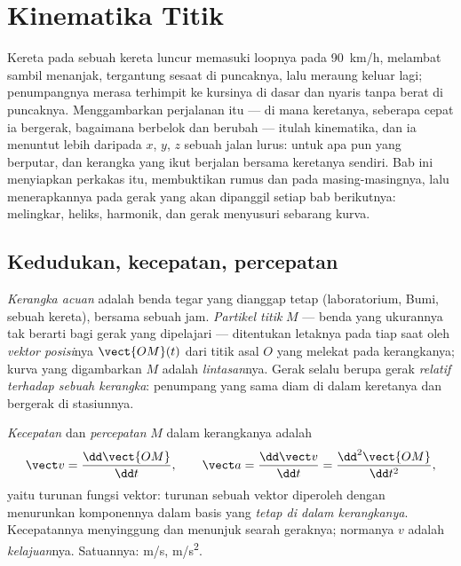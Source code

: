 \chapter{Kinematika Titik}\label{ch:b1:point-kinematics}

Kereta pada sebuah kereta luncur memasuki loopnya pada \qty{90}{km/h},
melambat sambil menanjak, tergantung sesaat di puncaknya, lalu meraung
keluar lagi; penumpangnya merasa terhimpit ke kursinya di dasar dan
nyaris tanpa berat di puncaknya. Menggambarkan perjalanan itu --- di
mana keretanya, seberapa cepat ia bergerak, bagaimana 
berbelok dan berubah --- itulah kinematika, dan ia menuntut lebih
daripada $x$, $y$, $z$ sebuah jalan lurus:  untuk apa pun
yang berputar, dan kerangka yang ikut berjalan bersama keretanya
sendiri. Bab ini menyiapkan perkakas itu, membuktikan rumus 
dan  pada masing-masingnya, lalu menerapkannya pada gerak yang
akan dipanggil setiap bab berikutnya: melingkar, heliks, harmonik, dan
gerak menyusuri sebarang kurva.

\section{Kedudukan, kecepatan, percepatan}

\begin{definition}\label{def:b1:point-kinematics:frame}
\emph{Kerangka acuan} adalah benda tegar yang dianggap tetap
(laboratorium, Bumi, sebuah kereta), bersama sebuah jam. \emph{Partikel
titik} $M$ --- benda yang ukurannya tak berarti bagi gerak yang
dipelajari --- ditentukan letaknya pada tiap saat oleh \emph{vektor
posisi}nya $\vect{OM}(t)$ dari titik asal $O$ yang melekat pada
kerangkanya; kurva yang digambarkan $M$ adalah \emph{lintasan}nya. Gerak
selalu berupa gerak \emph{relatif terhadap sebuah kerangka}: penumpang
yang sama diam di dalam keretanya dan bergerak di stasiunnya.
\end{definition}

\begin{definition}\label{def:b1:point-kinematics:velocity}
\emph{Kecepatan} dan \emph{percepatan} $M$ dalam kerangkanya adalah
\[
\vect v = \frac{\dd\vect{OM}}{\dd t}, \qquad
\vect a = \frac{\dd\vect v}{\dd t} = \frac{\dd^2\vect{OM}}{\dd t^2},
\]
yaitu turunan fungsi vektor: turunan sebuah vektor diperoleh dengan
menurunkan komponennya dalam basis yang \emph{tetap di dalam
kerangkanya}. Kecepatannya menyinggung  dan menunjuk searah
geraknya; normanya $v$ adalah \emph{kelajuan}nya. Satuannya:
\unit{m/s}, \unit{m/s^2}.
\end{definition}

